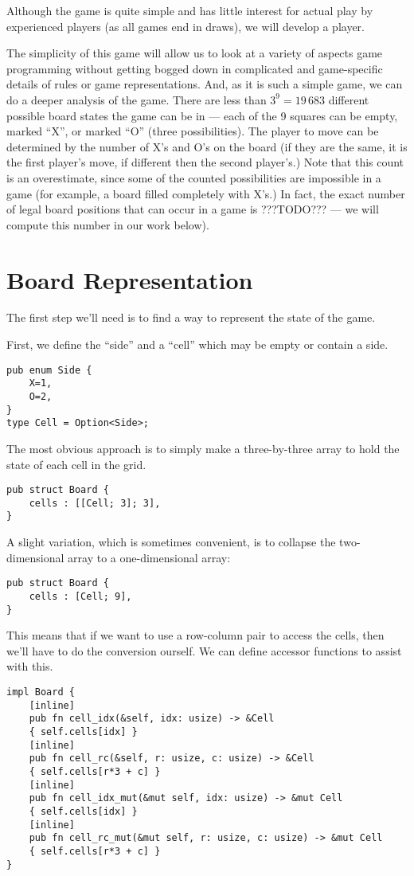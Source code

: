 \documentclass[10pt,dvipdfmx]{report}
\newcommand{\g}[1]{{\sc{#1}}\index{{\sc{#1}}}}
\begin{document}
Although the game is quite simple and has little interest for actual play by experienced players
(as all games end in draws), we will develop a player.

The simplicity of this game will allow us to look at a variety of aspects
game programming without getting bogged down in complicated and game-specific details
of rules or game representations.  And, as it is such a simple game, we can
do a deeper analysis of the game.  There are less than $3^9=19\,683$ different
possible board states the game can be in --- each of the 9 squares can be empty,
marked ``X'', or marked ``O'' (three possibilities).  The player to move can be
determined by the number of X's and O's on the board (if they are the same, it is
the first player's move, if different then the second player's.)  Note that this count
is an overestimate, since some of the counted possibilities are impossible in a game
(for example, a board filled completely with X's.)  In fact, the exact number of
legal board positions that can occur in a game is ???TODO??? --- we will compute this number
in our work below).

\section{Board Representation}
The first step we'll need is to find a way to represent the state of the game.

First, we define the ``side'' and a ``cell'' which may be empty or contain a side.
\begin{verbatim}
pub enum Side {
    X=1,
    O=2,
}
type Cell = Option<Side>;
\end{verbatim}

The most obvious approach is to simply make a three-by-three array to hold the
state of each cell in the \g{tic-tac-toe} grid.
\begin{verbatim}
pub struct Board {
    cells : [[Cell; 3]; 3],
}
\end{verbatim}

A slight variation, which is sometimes convenient, is to collapse the two-dimensional array
to a one-dimensional array:
\begin{verbatim}
pub struct Board {
    cells : [Cell; 9],
}
\end{verbatim}
This means that if we want to use a row-column pair to access the cells, then we'll have to do
the conversion ourself.  We can define accessor functions to assist with this.
\begin{verbatim}
impl Board {
    [inline]
    pub fn cell_idx(&self, idx: usize) -> &Cell
    { self.cells[idx] }
    [inline]
    pub fn cell_rc(&self, r: usize, c: usize) -> &Cell
    { self.cells[r*3 + c] }
    [inline]
    pub fn cell_idx_mut(&mut self, idx: usize) -> &mut Cell
    { self.cells[idx] }
    [inline]
    pub fn cell_rc_mut(&mut self, r: usize, c: usize) -> &mut Cell
    { self.cells[r*3 + c] }
}
\end{verbatim}
\end{document}
